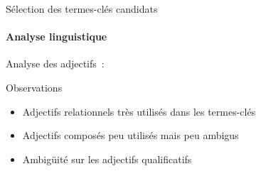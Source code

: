 \begin{frame}[t]{Sélection des termes-clés candidats}\framesubtitle{Analyse linguistique}
  Analyse des adjectifs~:

  \begin{table}
    \centering
    \caption{Taux d'adjectifs dans les termes-clés}
  \end{table}

  \begin{table}
    \centering
    \caption{Taux d'adjectifs dans les documents}
  \end{table}

  \begin{block}{Observations}
    \begin{itemize}
      \item{Adjectifs relationnels très utilisés dans les termes-clés}
      \item{Adjectifs composés peu utilisés mais peu ambigus}
      \item{Ambigüité sur les adjectifs qualificatifs}
    \end{itemize}
  \end{block}
\end{frame}

